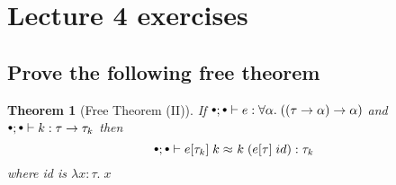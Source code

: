 \documentclass[a4paper,10pt,fleqn]{article}
\newcommand{\mtenv}{{\raisebox{1.5pt}{$\scriptstyle\bullet$}}}
\newcommand{\tlabs}[3]{\ensuremath{\lambda #1 : #2 . \; #3}}
\newcommand{\tarrow}[2]{\ensuremath{ #1 \rightarrow #2}}
\newcommand{\equivalence}[3]{\ensuremath{#1 \approx^{#2} #3}}
\newcommand{\lreq}[2]{\equivalence{#1}{ }{#2}}
\newtheorem*{theorem}{Theorem}
\begin{document}
\section*{Lecture 4 exercises}
\subsection*{Prove the following free theorem}  
\begin{theorem}[Free Theorem (II)]
    If $\mtenv; \mtenv \vdash e : \forall \alpha. \; (\tarrow{(\tarrow{\tau}{\alpha})}{\alpha})$ and 
       $\mtenv; \mtenv \vdash k : \tarrow{\tau}{\tau_k}$ then
    \[
      \mtenv; \mtenv \vdash \lreq{e[\tau_k] \; k}{k\;(e[\tau] \; id)} : \tau_k
    \]
    where id is $\tlabs{x}{\tau}{x}$
\end{theorem}
\end{document}

